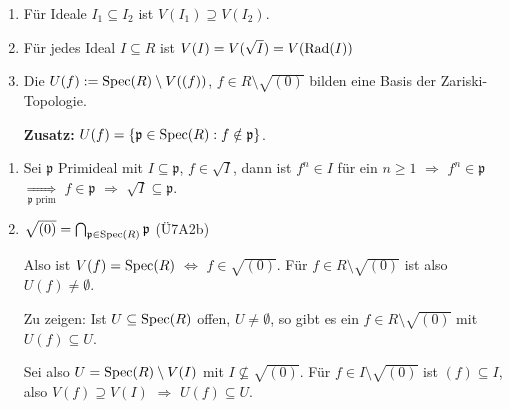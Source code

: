 \documentclass[a4paper, 10pt]{report}
\begin{document}
\begin{Bem}

\begin{enumerate}
\item F\"ur Ideale $I_1 \subseteq I_2$ ist $V(I_1) \supseteq V(I_2)$.

\item F\"ur jedes Ideal $I \subseteq R$ ist $V(I) = V(\sqrt{I}) = V(\mathrm{Rad}(I))$

\item
Die $U(f) := \mathrm{Spec}(R)\setminus V( (f) )$, $f \in R \setminus \sqrt{(0)}$ bilden
eine Basis der Zariski-Topologie.

\textbf{Zusatz:} $U(f) = \{ \mathfrak{p} \in \mathrm{Spec}(R) : f \notin \mathfrak{p} \}$.
\end{enumerate}
\end{Bem}

\begin{Bew}
\begin{enumerate}
\item Sei $\mathfrak{p}$ Primideal mit $I \subseteq \mathfrak{p}$, $f \in
\sqrt{I}$, dann ist $f^n \in I$ f\"ur ein $n \geq 1$ $\Rightarrow$ $f^n \in
\mathfrak{p}$ $\underset{\mathfrak{p} \text{ prim}}\Rightarrow$ $f \in
\mathfrak{p}$ $\Rightarrow$ $\sqrt{I} \subseteq \mathfrak{p}$.
\item 
$\sqrt{(0)} = \bigcap_{\mathfrak{p} \in \mathrm{Spec}(R)}{\mathfrak{p}}$ (\"U7A2b)

Also ist $V(f) = \mathrm{Spec}(R)$ $\Leftrightarrow$ $f \in \sqrt{(0)}$. F\"ur $f \in R \setminus \sqrt{(0)}$ ist also $U(f) \neq \emptyset$.

Zu zeigen: Ist $U \subseteq \mathrm{Spec}(R)$ offen, $U \neq \emptyset$, so gibt es ein $f \in R \setminus \sqrt{(0)}$ mit $U(f) \subseteq U$.

Sei also $U = \mathrm{Spec}(R)\setminus V(I)$ mit $I \nsubseteq \sqrt{(0)}$. F\"ur $f
\in I \setminus \sqrt{(0)}$ ist $(f) \subseteq I$, also $V(f) \supseteq V(I)$
$\Rightarrow$ $U(f) \subseteq U$. 
\end{enumerate}
\end{Bew}
\end{document}
